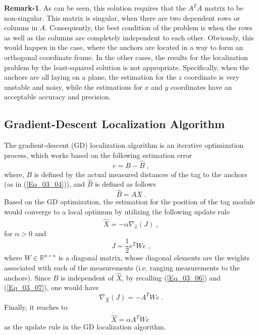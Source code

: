 \documentclass{article}
\begin{document}
\textbf{Remark-1}.
As can be seen, this solution requires that the $A^T A$ matrix to be non-singular. This matrix is singular, when there are two dependent rows or columns in $A$.
Consequently, the best condition of the problem is when the rows as well as the columns are completely independent to each other. Obviously, this would happen in the case, where the anchors are located in a way to form an orthogonal coordinate frame. In the other cases, the results for the localization problem by the least-squared solution is not appropriate. 
Specifically, when the anchors are all laying on a plane, the estimation for the $z$ coordinate is very unstable and noisy, while the estimations for $x$ and $y$ coordinates have an acceptable accuracy and precision. 

\subsection{Gradient-Descent Localization Algorithm}
The gradient-descent (GD) localization algorithm is an iterative optimization process, which works based on the following estimation error
\begin{equation} \label{Eq_03_06}
e = B - \hat{B} \;,
\end{equation}
where, $B$ is defined by the actual measured distances of the tag to the anchors (as in (\ref{Eq_03_04})), and $\hat{B}$ is defined as follows
\begin{equation} \label{Eq_03_07}
\hat{B} = A \hat{X} \;.
\end{equation}
Based on the GD optimization, the estimation for the position of the tag module would converge to a local optimum by utilizing the following update rule
\begin{equation} \label{Eq_03_08}
\dot{\hat{X}} = - \alpha \nabla_{\hat{x}}(J) \;,
\end{equation}
for $\alpha > 0$ and 
\begin{equation} \label{Eq_03_09}
J = \frac{1}{2} e^T W e \;,
\end{equation}
where $W \in \mathbb{R}^{n \times n}$ is a diagonal matrix, whose diagonal elements are the weights associated with each of the measurements (i.e. ranging measurements to the anchors). Since $B$ is independent of $\hat{X}$, by recalling (\ref{Eq_03_06}) and (\ref{Eq_03_07}), one would have
\begin{equation} \label{Eq_03_10}
\nabla_{\hat{X}} (J) = - A^T W e \;.
\end{equation}
Finally, it reaches to
\begin{equation} \label{Eq_03_11}
\dot{\hat{X}} = \alpha A^T W e \;
\end{equation}
as the update rule in the GD localization algorithm. \\
\end{document}
